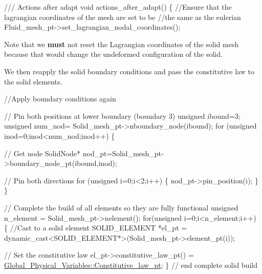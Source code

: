 \begin{DoxyCodeInclude}

\textcolor{comment}{}
\textcolor{comment}{ /// Actions after adapt}
\textcolor{comment}{} \textcolor{keywordtype}{void} actions\_after\_adapt()
  \{
   \textcolor{comment}{//Ensure that the lagrangian coordinates of the mesh are set to be}
   \textcolor{comment}{//the same as the eulerian}
   Fluid\_mesh\_pt->set\_lagrangian\_nodal\_coordinates();

\end{DoxyCodeInclude}


Note that we {\bfseries  must } not reset the Lagrangian coordinates of the solid mesh because that would change the undeformed configuration of the solid.

We then reapply the solid boundary conditions and pass the constitutive law to the solid elements.


\begin{DoxyCodeInclude}

   \textcolor{comment}{//Apply boundary conditions again}
   
   \textcolor{comment}{// Pin both positions at lower boundary (boundary 3)}
   \textcolor{keywordtype}{unsigned} ibound=3;
   \textcolor{keywordtype}{unsigned} num\_nod= Solid\_mesh\_pt->nboundary\_node(ibound);
   \textcolor{keywordflow}{for} (\textcolor{keywordtype}{unsigned} inod=0;inod<num\_nod;inod++)
    \{  
     
     \textcolor{comment}{// Get node}
     SolidNode* nod\_pt=Solid\_mesh\_pt->boundary\_node\_pt(ibound,inod);
     
     \textcolor{comment}{// Pin both directions}
     \textcolor{keywordflow}{for} (\textcolor{keywordtype}{unsigned} i=0;i<2;i++)
      \{
       nod\_pt->pin\_position(i);
      \}
    \}
   
   \textcolor{comment}{// Complete the build of all elements so they are fully functional}
   \textcolor{keywordtype}{unsigned} n\_element = Solid\_mesh\_pt->nelement();
   \textcolor{keywordflow}{for}(\textcolor{keywordtype}{unsigned} i=0;i<n\_element;i++)
    \{
     \textcolor{comment}{//Cast to a solid element}
     SOLID\_ELEMENT *el\_pt = 
      \textcolor{keyword}{dynamic\_cast<}SOLID\_ELEMENT*\textcolor{keyword}{>}(Solid\_mesh\_pt->element\_pt(i));
     
     \textcolor{comment}{// Set the constitutive law}
     el\_pt->constitutive\_law\_pt() =
      \hyperlink{namespaceGlobal__Physical__Variables_a2a37fb040c832ee7a086bb13bb02a100}{Global\_Physical\_Variables::Constitutive\_law\_pt};
    \} \textcolor{comment}{// end complete solid build}

\end{DoxyCodeInclude}


